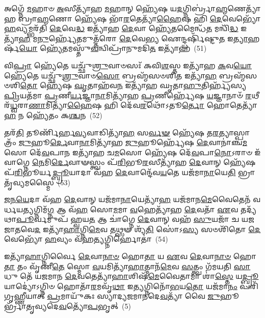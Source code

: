 {\anuvakamend[{𑌅𑌶𑌾॑𑌨𑍍𑌤𑌾𑌵𑌾\-\ul{𑌹} 𑌪𑌞𑍍𑌚᳴𑌦𑌶𑌾𑌬𑍍𑌰\-\ul{𑌵𑍀}\-𑌦𑌨𑍍𑌵𑌾᳴\-\ul{𑌹𑍈}\-𑌤𑌯𑌾᳴ 𑌵𑌰𑌿𑌷𑍍𑌯\-\ul{𑌤𑍇} 𑌮𑌾𑌮𑍇\-\ul{𑌕𑌾}\-𑌨𑍍𑌨\-\ul{𑌤𑍍𑌰𑌿}\-\-\ul{𑍞}\-𑌶𑌚𑍍𑌚᳴}]}%

𑌅𑌗𑍍𑌨𑍇᳴ \ul{𑌮}\-𑌹𑌾𑍞 \ul{𑌅}\-𑌸𑍀𑌤𑍍𑌯𑌾᳴𑌹 \ul{𑌮}\-𑌹𑌾𑌨𑍍 𑌹𑍍𑌯𑍇᳴𑌷 𑌯\-\ul{𑌦}\-𑌗𑍍𑌨𑌿𑌰𑍍𑌬𑍍𑌰𑌾॑\-\ul{𑌹𑍍𑌮}\-𑌣𑍇𑌤𑍍𑌯𑌾᳴𑌹 𑌬𑍍𑌰𑌾\-\ul{𑌹𑍍𑌮}\-𑌣𑍋 𑌹𑍍𑌯𑍇᳴𑌷 𑌭𑌾᳴\-\ul{𑌰}\-𑌤𑍇𑌤𑍍𑌯𑌾᳴\-\ul{𑌹𑍈}\-𑌷 𑌹𑌿 \ul{𑌦𑍇}\-𑌵𑍇𑌭𑍍𑌯𑍋᳴ \ul{𑌹}\-𑌵𑍍𑌯𑌮𑍍𑌭𑌰᳴𑌤𑌿 \ul{𑌦𑍇}\-𑌵𑍇\-\ul{𑌦𑍍𑌧} 𑌇𑌤𑍍𑌯𑌾᳴𑌹 \ul{𑌦𑍇}\-𑌵𑌾 𑌹𑍍𑌯𑍇᳴𑌤𑌮𑍈𑌨𑍍𑌧᳴\-\ul{𑌤} 𑌮𑌨𑍍𑌵𑌿᳴\-\ul{𑌦𑍍𑌧} 𑌇𑌤𑍍𑌯𑌾᳴\-\ul{𑌹} 𑌮\-\ul{𑌨𑍁}\-𑌰𑍍\mbox{}𑌹𑍍𑌯𑍇᳴𑌤𑌮𑍁𑌤𑍍𑌤᳴𑌰𑍋 \ul{𑌦𑍇}\-𑌵𑍇\-\ul{𑌭𑍍𑌯} 𑌐𑌨𑍍𑌦𑍍𑌧𑌰𑍍\mbox{}𑌷𑌿᳴𑌷𑍍𑌟𑍁\-\ul{𑌤} 𑌇\-\ul{𑌤𑍍𑌯𑌾}\-𑌹𑌰𑍍\mbox{}𑌷᳴\-\ul{𑌯𑍋} 𑌹𑍍𑌯𑍇᳴𑌤𑌮𑌸𑍍𑌤𑍁᳴\-\ul{𑌵}\-𑌨𑍍𑌵𑌿𑌪𑍍𑌰𑌾᳴𑌨𑍁𑌮𑌦𑌿\-\ul{𑌤} 𑌇𑌤𑍍𑌯𑌾᳴𑌹~(51)

𑌵𑌿\-\ul{𑌪𑍍𑌰𑌾} 𑌹𑍍𑌯𑍇᳴𑌤𑍇 𑌯𑌚𑍍𑌛𑍁᳴\-\ul{𑌶𑍍𑌰𑍁}\-𑌵𑌾𑍞𑌸𑌃᳴ 𑌕𑌵𑌿\-\ul{𑌶}\-𑌸𑍍𑌤 𑌇𑌤𑍍𑌯𑌾᳴𑌹 \ul{𑌕}\-𑌵\-\ul{𑌯𑍋} 𑌹𑍍𑌯𑍇᳴𑌤𑍇 𑌯𑌚𑍍𑌛𑍁᳴\-\ul{𑌶𑍍𑌰𑍁}\-𑌵𑌾𑍞\-\ul{𑌸𑍋} 𑌬𑍍𑌰𑌹𑍍𑌮᳴𑌸𑍞𑌶𑌿\-\ul{𑌤} 𑌇𑌤𑍍𑌯𑌾᳴\-\ul{𑌹} 𑌬𑍍𑌰𑌹𑍍𑌮᳴𑌸𑍞𑌶𑌿\-\ul{𑌤𑍋} 𑌹𑍍𑌯𑍇᳴𑌷 \ul{𑌘𑍃}\-𑌤𑌾𑌹᳴𑌵\-\ul{𑌨} 𑌇𑌤𑍍𑌯𑌾᳴𑌹 𑌘𑍃𑌤𑌾\-\ul{𑌹𑍁}\-𑌤𑌿𑌰𑍍\mbox{}𑌹𑍍𑌯᳴𑌸𑍍𑌯 \ul{𑌪𑍍𑌰𑌿}\-𑌯𑌤᳴𑌮𑌾 \ul{𑌪𑍍𑌰}\-𑌣𑍀\-\ul{𑌰𑍍𑌯}\-𑌜𑍍𑌞𑌾\-\ul{𑌨𑌾}\-𑌮𑌿𑌤𑍍𑌯𑌾᳴𑌹 \ul{𑌪𑍍𑌰}\-𑌣𑍀𑌰𑍍\mbox{}𑌹𑍍𑌯𑍇᳴𑌷 \ul{𑌯}\-𑌜𑍍𑌞𑌾𑌨𑌾𑍞᳴ \ul{𑌰}\-𑌥𑍀𑌰᳴\-\ul{𑌧𑍍𑌵}\-𑌰𑌾\-\ul{𑌣𑌾}\-𑌮𑌿𑌤𑍍𑌯𑌾᳴\-\ul{𑌹𑍈}\-𑌷 𑌹𑌿 𑌦𑍇᳴𑌵\-\ul{𑌰}\-𑌥𑍋᳴\-𑌽𑌤𑍂\-\ul{𑌰𑍍𑌤𑍋} 𑌹𑍋𑌤𑍇𑌤𑍍𑌯𑌾᳴\-\ul{𑌹} 𑌨 𑌹𑍍𑌯𑍇᳴𑌤𑌂 𑌕\-\ul{𑌶𑍍𑌚}\-𑌨~(52)

𑌤𑌰᳴\-\ul{𑌤𑌿} 𑌤𑍂𑌰𑍍𑌣𑌿᳴𑌰𑍍\mbox{}𑌹\-\ul{𑌵𑍍𑌯}\-𑌵𑌾𑌡𑌿𑌤𑍍𑌯𑌾᳴\-\ul{𑌹} 𑌸\-\ul{𑌰𑍍𑌵}\-\-\ul{𑍟} 𑌹𑍍𑌯𑍇᳴𑌷 𑌤\-\ul{𑌰}\-𑌤𑍍𑌯𑌾𑌸𑍍𑌪𑌾𑌤𑍍𑌰𑌂᳴ \ul{𑌜𑍁}\-𑌹𑍂\-\ul{𑌰𑍍𑌦𑍇}\-𑌵𑌾\-\ul{𑌨𑌾}\-𑌮𑌿𑌤𑍍𑌯𑌾᳴𑌹 \ul{𑌜𑍁}\-𑌹𑍂𑌰𑍍\mbox{}𑌹𑍍𑌯𑍇᳴𑌷 \ul{𑌦𑍇}\-𑌵𑌾𑌨𑌾॑𑌞𑍍𑌚\-\ul{𑌮}\-𑌸𑍋 𑌦𑍇᳴\-\ul{𑌵}\-𑌪𑌾\-\ul{𑌨} 𑌇𑌤𑍍𑌯𑌾᳴𑌹 𑌚\-\ul{𑌮}\-𑌸𑍋 𑌹𑍍𑌯𑍇᳴𑌷 𑌦𑍇᳴\-\ul{𑌵}\-𑌪𑌾\-\ul{𑌨𑍋}\-\-𑌽𑌰𑌾𑍞 𑌇᳴𑌵𑌾𑌗𑍍𑌨𑍇 \ul{𑌨𑍇}\-𑌮𑌿\-\ul{𑌰𑍍𑌦𑍇}\-𑌵𑌾𑍟𑌸𑍍𑌤𑍍𑌵𑌂 𑌪᳴\-\ul{𑌰𑌿}\-𑌭𑍂\-\ul{𑌰}\-𑌸𑍀𑌤𑍍𑌯𑌾᳴𑌹 \ul{𑌦𑍇}\-𑌵𑌾𑌨𑍍 𑌹𑍍𑌯𑍇᳴𑌷 𑌪᳴\-\ul{𑌰𑌿}\-𑌭𑍂𑌰𑍍𑌯\-\ul{𑌦𑍍𑌬𑍍𑌰𑍂}\-𑌯𑌾𑌦𑌾 𑌵᳴𑌹 \ul{𑌦𑍇}\-𑌵𑌾𑌨𑍍𑌦𑍇᳴𑌵\-\ul{𑌯}\-𑌤𑍇 𑌯𑌜᳴𑌮𑌾\-\ul{𑌨𑌾}\-𑌯𑍇\-\ul{𑌤𑌿} 𑌭𑍍𑌰𑌾𑌤𑍃᳴𑌵𑍍𑌯𑌮𑌸𑍍𑌮𑍈~(53)

\-\ul{𑌜}\-\-\ul{𑌨}\-\-\ul{𑌯𑍇}\-𑌦𑌾 𑌵᳴𑌹 \ul{𑌦𑍇}\-𑌵𑌾𑌨𑍍 𑌯𑌜᳴𑌮𑌾\-\ul{𑌨𑌾}\-𑌯𑍇𑌤𑍍𑌯𑌾᳴\-\ul{𑌹} 𑌯𑌜᳴𑌮𑌾𑌨\-\ul{𑌮𑍇}\-𑌵𑍈𑌤𑍇𑌨᳴ 𑌵𑌰𑍍𑌧𑌯\-\ul{𑌤𑍍𑌯}\-𑌗𑍍𑌨𑌿𑌮᳴\-\ul{𑌗𑍍𑌨} 𑌆 𑌵᳴\-\ul{𑌹} 𑌸𑍋\-\ul{𑌮}\-𑌮𑌾 \ul{𑌵}\-𑌹𑍇𑌤𑍍𑌯𑌾᳴𑌹 \ul{𑌦𑍇}\-𑌵𑌤𑌾᳴ \ul{𑌏}\-𑌵 𑌤𑌦𑍍𑌯᳴𑌥𑌾\-\ul{𑌪𑍂}\-𑌰𑍍𑌵𑌮𑍁𑌪᳴ 𑌹𑍍𑌵𑌯\-\ul{𑌤} 𑌆 𑌚𑌾॑𑌗𑍍𑌨𑍇 \ul{𑌦𑍇}\-𑌵𑌾𑌨𑍍 𑌵𑌹᳴ \ul{𑌸𑍁}\-𑌯𑌜𑌾᳴ 𑌚 𑌯𑌜 𑌜𑌾𑌤𑌵𑍇\-\ul{𑌦} 𑌇𑌤𑍍𑌯𑌾᳴\-\ul{𑌹𑌾}\-𑌗𑍍𑌨𑌿\-\ul{𑌮𑍇}\-𑌵 𑌤𑌥𑍍𑌸𑍟 𑌶𑍍𑌯᳴\-\ul{𑌤𑌿} 𑌸𑍋॑\-𑌽\-\ul{𑌸𑍍𑌯} 𑌸𑍞𑌶𑌿᳴𑌤𑍋 \ul{𑌦𑍇}\-𑌵𑍇𑌭𑍍𑌯𑍋᳴ \ul{𑌹}\-𑌵𑍍𑌯𑌂 𑌵᳴𑌹\-\ul{𑌤𑍍𑌯}\-𑌗𑍍𑌨𑌿𑌰𑍍\mbox{}𑌹𑍋𑌤𑌾॑~(54)

𑌇𑌤𑍍𑌯𑌾᳴\-\ul{𑌹𑌾}\-𑌗𑍍𑌨𑌿𑌰𑍍𑌵𑍈 \ul{𑌦𑍇}\-𑌵𑌾\-\ul{𑌨𑌾}\-\-\ul{𑍞} 𑌹𑍋\-\ul{𑌤𑌾} 𑌯 \ul{𑌏}\-𑌵 \ul{𑌦𑍇}\-𑌵𑌾\-\ul{𑌨𑌾}\-\-\ul{𑍞} 𑌹𑍋\-\ul{𑌤𑌾} 𑌤𑌂 𑌵𑍃᳴𑌣𑍀\-\ul{𑌤𑍇} 𑌸𑍍𑌮𑍋 \ul{𑌵}\-𑌯𑌮𑌿𑌤𑍍𑌯𑌾᳴\-\ul{𑌹𑌾}\-𑌤𑍍𑌮𑌾𑌨᳴\-\ul{𑌮𑍇}\-𑌵 \ul{𑌸}\-𑌤𑍍𑌤𑍍𑌵𑌂 𑌗᳴𑌮𑌯𑌤𑌿 \ul{𑌸𑌾}\-𑌧𑍁 𑌤𑍇᳴ 𑌯𑌜𑌮𑌾𑌨 \ul{𑌦𑍇}\-𑌵𑌤𑍇𑌤𑍍𑌯𑌾᳴\-\ul{𑌹𑌾}\-𑌶𑌿𑌷᳴\-\ul{𑌮𑍇}\-𑌵𑍈𑌤𑌾𑌮𑌾 𑌶𑌾॑\-\ul{𑌸𑍍𑌤𑍇} 𑌯\-\ul{𑌦𑍍𑌬𑍍𑌰𑍂}\-𑌯𑌾𑌦𑍍𑌯𑍋॑\-𑌽𑌗𑍍𑌨𑌿𑍞 𑌹𑍋𑌤𑌾᳴\-\ul{𑌰}\-𑌮𑌵𑍃᳴\-\ul{𑌥𑌾} 𑌇\-\ul{𑌤𑍍𑌯}\-𑌗𑍍𑌨𑌿𑌨𑍋᳴\-\ul{𑌭}\-𑌯\-\ul{𑌤𑍋} 𑌯𑌜᳴𑌮𑌾\-\ul{𑌨𑌂} 𑌪𑌰𑌿᳴ 𑌗𑍃𑌹𑍍𑌣𑍀𑌯𑌾𑌤𑍍 \ul{𑌪𑍍𑌰}\-𑌮𑌾𑌯𑍁᳴𑌕𑌃 𑌸𑍍𑌯𑌾𑌦𑍍𑌯𑌜𑌮𑌾𑌨𑌦𑍇\-\ul{𑌵}\-𑌤𑍍𑌯𑌾᳴ 𑌵𑍈 \ul{𑌜𑍁}\-𑌹𑍂𑌰𑍍𑌭𑍍𑌰𑌾᳴𑌤𑍃𑌵𑍍𑌯𑌦𑍇\-\ul{𑌵}\-𑌤𑍍𑌯𑍋᳴\-\ul{𑌪}\-𑌭𑍃𑌤𑍍~(5)

